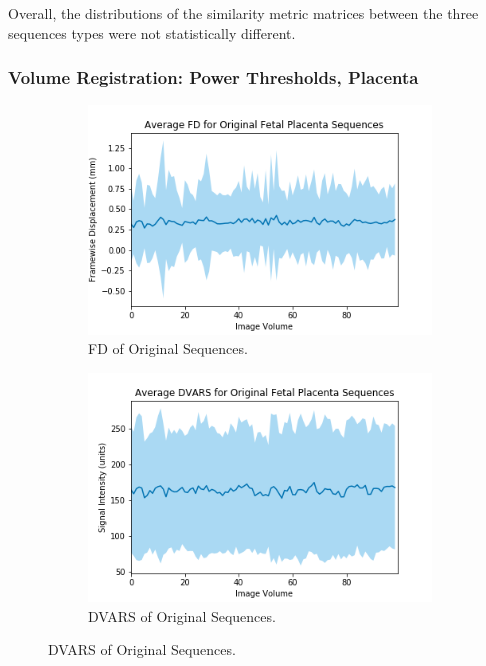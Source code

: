 Overall, the distributions of the similarity metric matrices between the three sequences types were not statistically different.

\subsubsection{Volume Registration: Power Thresholds, Placenta}

\begin{figure}[t!]
	\centering
	\begin{subfigure}{0.4\textwidth}
		\centering
		\includegraphics[width=1.0\textwidth]{6/figures/fetal-placenta-bold-fd-150.png}
		\caption{FD of Original Sequences.}
	\end{subfigure}
	\hspace{0.05\textwidth}
	\begin{subfigure}{0.4\textwidth}
		\centering
		\includegraphics[width=1.0\textwidth]{6/figures/fetal-placenta-bold-dvars-150.png}
		\caption{DVARS of Original Sequences.}
	\end{subfigure}
	

\end{figure}
